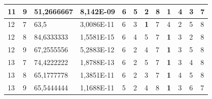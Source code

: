 \documentclass[conference]{IEEEtran}
\begin{document}
\begin{table}[]
\begin{tabular}{|llll|llllllll|}
		\multicolumn{1}{|l|}{11}  & \multicolumn{1}{l|}{9}         & \multicolumn{1}{l|}{51,2666667}    & 8,142E-09  & \multicolumn{1}{l|}{6}   & \multicolumn{1}{l|}{5}          & \multicolumn{1}{l|}{2}          & \multicolumn{1}{l|}{8}   & \multicolumn{1}{l|}{\textbf{1}} & \multicolumn{1}{l|}{4}          & \multicolumn{1}{l|}{3}          & 7                      \\ \hline
		\multicolumn{1}{|l|}{12}  & \multicolumn{1}{l|}{7}         & \multicolumn{1}{l|}{63,5}          & 3,0086E-11 & \multicolumn{1}{l|}{6}   & \multicolumn{1}{l|}{3}          & \multicolumn{1}{l|}{\textbf{1}} & \multicolumn{1}{l|}{7}   & \multicolumn{1}{l|}{4}          & \multicolumn{1}{l|}{2}          & \multicolumn{1}{l|}{5}          & 8                      \\ \hline
		\multicolumn{1}{|l|}{12}  & \multicolumn{1}{l|}{8}         & \multicolumn{1}{l|}{84,6333333}    & 1,5581E-15 & \multicolumn{1}{l|}{6}   & \multicolumn{1}{l|}{4}          & \multicolumn{1}{l|}{5}          & \multicolumn{1}{l|}{7}   & \multicolumn{1}{l|}{\textbf{1}} & \multicolumn{1}{l|}{3}          & \multicolumn{1}{l|}{2}          & 8                      \\ \hline
		\multicolumn{1}{|l|}{12}  & \multicolumn{1}{l|}{9}         & \multicolumn{1}{l|}{67,2555556}    & 5,2883E-12 & \multicolumn{1}{l|}{6}   & \multicolumn{1}{l|}{2}          & \multicolumn{1}{l|}{4}          & \multicolumn{1}{l|}{7}   & \multicolumn{1}{l|}{\textbf{1}} & \multicolumn{1}{l|}{3}          & \multicolumn{1}{l|}{5}          & 8                      \\ \hline
		\multicolumn{1}{|l|}{13}  & \multicolumn{1}{l|}{7}         & \multicolumn{1}{l|}{74,4222222}    & 1,8788E-13 & \multicolumn{1}{l|}{6}   & \multicolumn{1}{l|}{2}          & \multicolumn{1}{l|}{5}          & \multicolumn{1}{l|}{7}   & \multicolumn{1}{l|}{\textbf{1}} & \multicolumn{1}{l|}{3}          & \multicolumn{1}{l|}{4}          & 8                      \\ \hline
		\multicolumn{1}{|l|}{13}  & \multicolumn{1}{l|}{8}         & \multicolumn{1}{l|}{65,1777778}    & 1,3851E-11 & \multicolumn{1}{l|}{6}   & \multicolumn{1}{l|}{2}          & \multicolumn{1}{l|}{3}          & \multicolumn{1}{l|}{7}   & \multicolumn{1}{l|}{\textbf{1}} & \multicolumn{1}{l|}{4}          & \multicolumn{1}{l|}{5}          & 8                      \\ \hline
		\multicolumn{1}{|l|}{13}  & \multicolumn{1}{l|}{9}         & \multicolumn{1}{l|}{65,5444444}    & 1,1688E-11 & \multicolumn{1}{l|}{5}   & \multicolumn{1}{l|}{2}          & \multicolumn{1}{l|}{4}          & \multicolumn{1}{l|}{8}   & \multicolumn{1}{l|}{\textbf{1}} & \multicolumn{1}{l|}{3}          & \multicolumn{1}{l|}{6}          & 7                      \\ \hline

\end{tabular}
\end{table}
\end{document}
